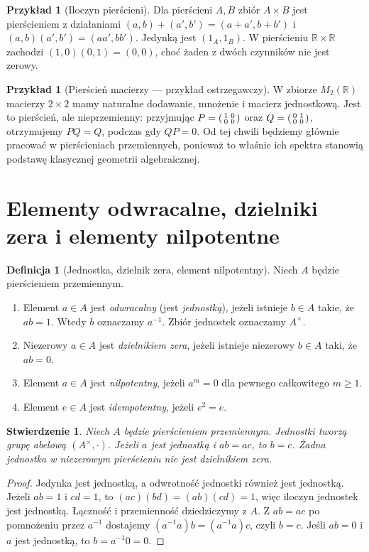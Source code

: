 \documentclass[11pt,a4paper,openany]{report}
\numberwithin{equation}{section}
\theoremstyle{plain}
\newtheorem{stwierdzenie}[twierdzenie]{Stwierdzenie}
\theoremstyle{definition}
\newtheorem{definicja}[twierdzenie]{Definicja}
\newtheorem{przyklad}[twierdzenie]{Przykład}
\theoremstyle{remark}
\newcommand{\R}{\mathbb R}
\begin{document}
\begin{przyklad}[Iloczyn pierścieni]
Dla pierścieni $A,B$ zbiór $A\times B$ jest pierścieniem z działaniami
$(a,b)+(a',b')=(a+a',b+b')$ i
$(a,b)(a',b')=(aa',bb')$. Jedynką jest $(1_A,1_B)$.
W pierścieniu $\R\times\R$ zachodzi $(1,0)(0,1)=(0,0)$,
choć żaden z dwóch czynników nie jest zerowy.
\end{przyklad}

\begin{przyklad}[Pierścień macierzy — przykład ostrzegawczy]
W zbiorze $M_2(\R)$ macierzy $2\times2$ mamy naturalne dodawanie,
mnożenie i macierz jednostkową. Jest to pierścień, ale nieprzemienny:
przyjmując
$P=\begin{psmallmatrix}1&0\\0&0\end{psmallmatrix}$ oraz
$Q=\begin{psmallmatrix}0&1\\0&0\end{psmallmatrix}$,
otrzymujemy $PQ=Q$, podczas gdy $QP=0$.
Od tej chwili będziemy głównie pracować w pierścieniach przemiennych,
ponieważ to właśnie ich spektra stanowią podstawę klasycznej geometrii
algebraicznej.
\end{przyklad}

\section{Elementy odwracalne, dzielniki zera i elementy nilpotentne}

\begin{definicja}[Jednostka, dzielnik zera, element nilpotentny]
Niech $A$ będzie pierścieniem przemiennym.
\begin{enumerate}[label=\arabic*)]
\item Element $a\in A$ jest \emph{odwracalny} (jest \emph{jednostką}),
jeżeli istnieje $b\in A$ takie, że $ab=1$. Wtedy $b$ oznaczamy $a^{-1}$.
Zbiór jednostek oznaczamy $A^\times$.
\item Niezerowy $a\in A$ jest \emph{dzielnikiem zera}, jeżeli istnieje
niezerowy $b\in A$ taki, że $ab=0$.
\item Element $a\in A$ jest \emph{nilpotentny}, jeżeli $a^m=0$
dla pewnego całkowitego $m\ge1$.
\item Element $e\in A$ jest \emph{idempotentny}, jeżeli $e^2=e$.
\end{enumerate}
\end{definicja}

\begin{stwierdzenie}
Niech $A$ będzie pierścieniem przemiennym. Jednostki tworzą grupę
abelową $(A^\times,\cdot)$. Jeżeli $a$ jest jednostką i $ab=ac$,
to $b=c$. Żadna jednostka w niezerowym pierścieniu nie jest dzielnikiem zera.
\end{stwierdzenie}
\begin{proof}
Jedynka jest jednostką, a odwrotność jednostki również jest jednostką.
Jeżeli $ab=1$ i $cd=1$, to $(ac)(bd)=(ab)(cd)=1$, więc iloczyn jednostek
jest jednostką. Łączność i przemienność dziedziczymy z $A$.
Z $ab=ac$ po pomnożeniu przez $a^{-1}$ dostajemy
$(a^{-1}a)b=(a^{-1}a)c$, czyli $b=c$.
Jeśli $ab=0$ i $a$ jest jednostką, to $b=a^{-1}0=0$.
\end{proof}
\end{document}
